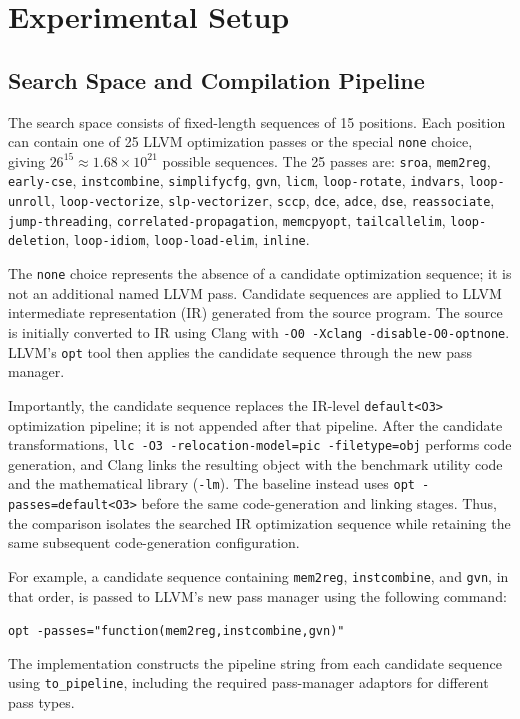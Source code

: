 \section{Experimental Setup}
\subsection{Search Space and Compilation Pipeline}
The search space consists of fixed-length sequences of 15 positions. Each position can contain one of 25 LLVM optimization passes or the special \texttt{none} choice, giving $26^{15} \approx 1.68\times 10^{21}$ possible sequences. The 25 passes are:
\texttt{sroa}, \texttt{mem2reg}, \texttt{early-cse}, \texttt{instcombine}, \texttt{simplifycfg}, \texttt{gvn}, \texttt{licm}, \texttt{loop-rotate}, \texttt{indvars}, \texttt{loop-unroll}, \texttt{loop-vectorize}, \texttt{slp-vectorizer}, \texttt{sccp}, \texttt{dce}, \texttt{adce}, \texttt{dse}, \texttt{reassociate}, \texttt{jump-threading}, \texttt{correlated-propagation}, \texttt{memcpyopt}, \texttt{tailcallelim}, \texttt{loop-deletion}, \texttt{loop-idiom}, \texttt{loop-load-elim}, \texttt{inline}.

The \texttt{none} choice represents the absence of a candidate optimization sequence; it is not an additional named LLVM pass. Candidate sequences are applied to LLVM intermediate representation (IR) generated from the source program. The source is initially converted to IR using Clang with \texttt{-O0 -Xclang -disable-O0-optnone}. LLVM's \texttt{opt} tool then applies the candidate sequence through the new pass manager.

Importantly, the candidate sequence replaces the IR-level \texttt{default<O3>} optimization pipeline; it is not appended after that pipeline. After the candidate transformations, \texttt{llc -O3 -relocation-model=pic -filetype=obj} performs code generation, and Clang links the resulting object with the benchmark utility code and the mathematical library (\texttt{-lm}). The baseline instead uses \texttt{opt -passes=default<O3>} before the same code-generation and linking stages. Thus, the comparison isolates the searched IR optimization sequence while retaining the same subsequent code-generation configuration.

For example, a candidate sequence containing \texttt{mem2reg}, \texttt{instcombine}, and \texttt{gvn}, in that order, is passed to LLVM's new pass manager using the following command:
\begin{center}
\texttt{opt -passes="function(mem2reg,instcombine,gvn)"}
\end{center}
The implementation constructs the pipeline string from each candidate sequence using \texttt{to\_pipeline}, including the required pass-manager adaptors for different pass types.

